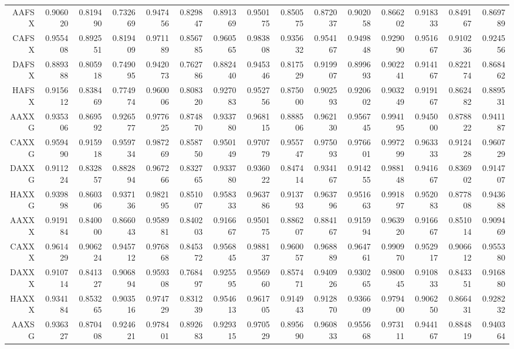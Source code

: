 {\begin{tabular}{rrrrrrrrrrrrrrr}
	AAFSX & 0.906020 & 0.819490 & 0.732669 & 0.947456 & 0.829847 & 0.891369 & 0.950175 & 0.850575 & 0.872037 & 0.902058 & 0.866202 & 0.918333 & 0.849167 & 0.869789 \\ 
	CAFSX & 0.955408 & 0.892551 & 0.819409 & 0.971189 & 0.856785 & 0.960565 & 0.983808 & 0.935632 & 0.954167 & 0.949848 & 0.929090 & 0.951667 & 0.910236 & 0.924556 \\ 
	DAFSX & 0.889388 & 0.805918 & 0.749095 & 0.942073 & 0.762786 & 0.882440 & 0.945346 & 0.817529 & 0.919907 & 0.899693 & 0.902241 & 0.914167 & 0.822174 & 0.868462 \\ 
	HAFSX & 0.915612 & 0.838469 & 0.774974 & 0.960006 & 0.808320 & 0.927083 & 0.952756 & 0.875000 & 0.902593 & 0.920602 & 0.903249 & 0.919167 & 0.862482 & 0.889531 \\ 
	AAXXG & 0.935306 & 0.869592 & 0.926577 & 0.977625 & 0.874870 & 0.933780 & 0.968115 & 0.888506 & 0.962130 & 0.956745 & 0.994195 & 0.945000 & 0.878822 & 0.941187 \\ 
	CAXXG & 0.959490 & 0.915918 & 0.959734 & 0.987269 & 0.858750 & 0.950149 & 0.970779 & 0.955747 & 0.975093 & 0.976601 & 0.997299 & 0.963333 & 0.912428 & 0.960729 \\ 
	DAXXG & 0.911224 & 0.832857 & 0.882894 & 0.967266 & 0.832765 & 0.933780 & 0.936022 & 0.847414 & 0.934167 & 0.914255 & 0.988148 & 0.941667 & 0.836902 & 0.914707 \\ 
	HAXXG & 0.939898 & 0.860306 & 0.937136 & 0.982195 & 0.851007 & 0.958333 & 0.963786 & 0.913793 & 0.963796 & 0.951663 & 0.991897 & 0.952083 & 0.877808 & 0.943688 \\ 
	AAXXX & 0.919184 & 0.840000 & 0.866043 & 0.958981 & 0.840203 & 0.916667 & 0.950175 & 0.886207 & 0.884167 & 0.915994 & 0.963920 & 0.916667 & 0.851014 & 0.909469 \\ 
	CAXXX & 0.961429 & 0.906224 & 0.945712 & 0.976868 & 0.845372 & 0.956845 & 0.988137 & 0.960057 & 0.968889 & 0.964761 & 0.990970 & 0.952917 & 0.906612 & 0.955380 \\ 
	DAXXX & 0.910714 & 0.841327 & 0.906894 & 0.959308 & 0.768497 & 0.925595 & 0.956960 & 0.857471 & 0.940926 & 0.930265 & 0.980045 & 0.910833 & 0.843351 & 0.916880 \\ 
	HAXXX & 0.934184 & 0.853265 & 0.903516 & 0.974729 & 0.831239 & 0.954613 & 0.961705 & 0.914943 & 0.912870 & 0.936609 & 0.979400 & 0.906250 & 0.866431 & 0.928232 \\ 
	AAXSG & 0.936327 & 0.870408 & 0.924621 & 0.978401 & 0.892683 & 0.929315 & 0.970529 & 0.895690 & 0.960833 & 0.955668 & 0.973111 & 0.944167 & 0.884819 & 0.940364 \\ 

\end{tabular}}

